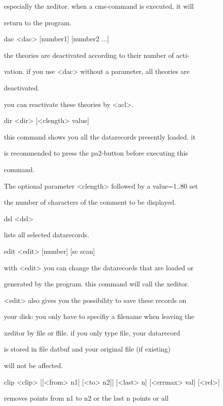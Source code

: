 \documentclass[]{article}
\begin{document}
especially the xeditor. when a cms-command is executed, it will

return to the program.

dac \textless{}dac\textgreater{} {[}number1{]} {[}number2 ...{]}

the theories are deactivated according to their number of acti-

vation. if you use \textless{}dac\textgreater{} without a parameter, all
theories are

deactivated.

you can reactivate these theories by \textless{}acl\textgreater{}.

dir \textless{}dir\textgreater{} {[}\textless{}clength\textgreater{}
value{]}

this command shows you all the datarecords presently loaded. it

is recommended to press the pa2-button before executing this

command.

The optional parameter \textless{}clength\textgreater{} followed by a
value=1..80 set

the number of characters of the comment to be displayed.

dsl \textless{}dsl\textgreater{}

lists all selected datarecords.

edit \textless{}edit\textgreater{} {[}number{]} {[}sc scan{]}

with \textless{}edit\textgreater{} you can change the datarecords that
are loaded or

generated by the program. this command will call the xeditor.

\textless{}edit\textgreater{} also gives you the possibility to save
these records on

your disk: you only have to specifiy a filename when leaving the

xeditor by file or ffile. if you only type file, your datarecord

is stored in file datbuf and your original file (if existing)

will not be affected.

clip \textless{}clip\textgreater{} {[}{[}\textless{}from\textgreater{}
n1{]} {[}\textless{}to\textgreater{} n2{]}{]}
{[}\textless{}last\textgreater{} n{]} {[}\textless{}errmax\textgreater{}
val{]} {[}\textless{}rel\textgreater{}{]}

removes points from n1 to n2 or the last n points or all
\end{document}
